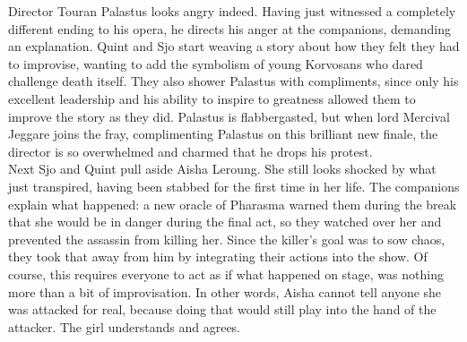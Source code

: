 Director Touran Palastus looks angry indeed. Having just witnessed a completely different ending to his opera, he directs his anger at the companions, demanding an explanation. Quint and Sjo start weaving a story about how they felt they had to improvise, wanting to add the symbolism of young Korvosans who dared challenge death itself. They also shower Palastus with compliments, since only his excellent leadership and his ability to inspire to greatness allowed them to improve the story as they did. Palastus is flabbergasted, but when lord Mercival Jeggare joins the fray, complimenting Palastus on this brilliant new finale, the director is so overwhelmed and charmed that he drops his protest.\\

Next Sjo and Quint pull aside Aisha Leroung. She still looks shocked by what just transpired, having been stabbed for the first time in her life. The companions explain what happened: a new oracle of Pharasma warned them during the break that she would be in danger during the final act, so they watched over her and prevented the assassin from killing her. Since the killer's goal was to sow chaos, they took that away from him by integrating their actions into the show. Of course, this requires everyone to act as if what happened on stage, was nothing more than a bit of improvisation. In other words, Aisha cannot tell anyone she was attacked for real, because doing that would still play into the hand of the attacker. The girl understands and agrees.\\

